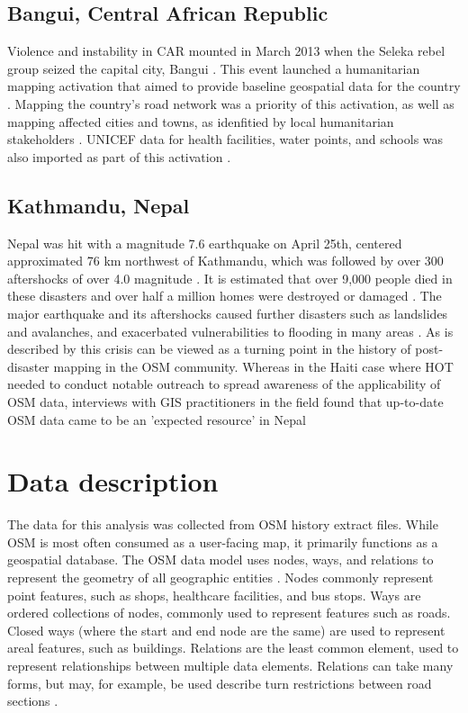 \subsection{Bangui, Central African Republic}

Violence and instability in CAR mounted in March 2013 when the Seleka rebel group seized the capital city, Bangui \parencite{noauthor_violence_2020}. This event launched a humanitarian mapping activation that aimed to provide baseline geospatial data for the country \parencite{noauthor_wikiproject_2020-1}. Mapping the country's road network was a priority of this activation, as well as mapping affected cities and towns, as idenfitied by local humanitarian stakeholders \parencite{noauthor_wikiproject_2020-1}. UNICEF data for health facilities, water points, and schools was also imported as part of this activation \parencite{noauthor_wikiproject_2020-1}.

\subsection{Kathmandu, Nepal}

Nepal was hit with a magnitude 7.6 earthquake on April 25th, centered approximated 76 km northwest of Kathmandu, which was followed by over 300 aftershocks of over 4.0 magnitude \parencite{noauthor_nepal_2015}. It is estimated that over 9,000 people died in these disasters and over half a million homes were destroyed or damaged \parencite{noauthor_nepal_2015}. The major earthquake and its aftershocks caused further disasters such as landslides and avalanches, and exacerbated vulnerabilities to flooding in many areas \parencite{noauthor_nepal_2015}. As is described by \textcite{soden_infrastructure_2016} this crisis can be viewed as a turning point in the history of post-disaster mapping in the OSM community. Whereas in the Haiti case where HOT needed to conduct notable outreach to spread awareness of the applicability of OSM data, interviews with GIS practitioners in the field found that up-to-date OSM data came to be an 'expected resource' in Nepal \parencite[p. 2801]{soden_infrastructure_2016}


\section{Data description}

The data for this analysis was collected from OSM history extract files. While OSM is most often consumed as a user-facing map, it primarily functions as a geospatial database. The OSM data model uses nodes, ways, and relations to represent the geometry of all geographic entities \parencite{noauthor_elements_2020}. Nodes commonly represent point features, such as shops, healthcare facilities, and bus stops. Ways are ordered collections of nodes, commonly used to represent features such as roads. Closed ways (where the start and end node are the same) are used to represent areal features, such as buildings. Relations are the least common element, used to represent relationships between multiple data elements. Relations can take many forms, but may, for example, be used describe turn restrictions between road sections \parencite{noauthor_elements_2020}. 

